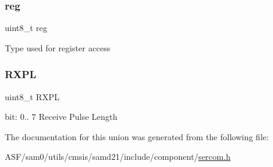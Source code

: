 \subsubsection{\texorpdfstring{reg}{reg}}
{\footnotesize\ttfamily uint8\+\_\+t reg}

Type used for register access \mbox{\label{union_s_e_r_c_o_m___u_s_a_r_t___r_x_p_l___type_a2cdf3163c77203c3e8e2d4aa160ca227}} 
\subsubsection{\texorpdfstring{RXPL}{RXPL}}
{\footnotesize\ttfamily uint8\+\_\+t R\+X\+PL}

bit\+: 0.. 7 Receive Pulse Length 

The documentation for this union was generated from the following file\+:\begin{DoxyCompactItemize}
\item 
A\+S\+F/sam0/utils/cmsis/samd21/include/component/\mbox{\hyperlink{utils_2cmsis_2samd21_2include_2component_2sercom_8h}{sercom.\+h}}\end{DoxyCompactItemize}
